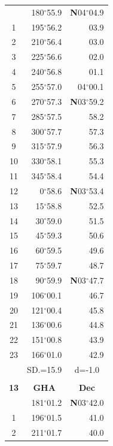\documentclass[10pt, a4paper]{report}
\begin{document}
\begin{scriptsize}
\begin{tabular*}{0.2\textwidth}[t]{@{\extracolsep{\fill}}|c|rr|}
\hline\rule{0pt}{2.6ex}\noindent
0 & 180$^\circ$55.9 & \textbf{N}04$^\circ$04.9\\
1 & 195$^\circ$56.2 & 03.9\\
2 & 210$^\circ$56.4 & 03.0\\
3 & 225$^\circ$56.6 & \raisebox{0.24ex}{\boldmath$\cdot$~\boldmath$\cdot$~~}02.0\\
4 & 240$^\circ$56.8 & 01.1\\
5 & 255$^\circ$57.0 & 04$^\circ$00.1\\[2Pt]
6 & 270$^\circ$57.3 & \textbf{N}03$^\circ$59.2\\
7 & 285$^\circ$57.5 & 58.2\\
8 & 300$^\circ$57.7 & 57.3\\
9 & 315$^\circ$57.9 & \raisebox{0.24ex}{\boldmath$\cdot$~\boldmath$\cdot$~~}56.3\\
10 & 330$^\circ$58.1 & 55.3\\
11 & 345$^\circ$58.4 & 54.4\\[2Pt]
12 & 0$^\circ$58.6 & \textbf{N}03$^\circ$53.4\\
13 & 15$^\circ$58.8 & 52.5\\
14 & 30$^\circ$59.0 & 51.5\\
15 & 45$^\circ$59.3 & \raisebox{0.24ex}{\boldmath$\cdot$~\boldmath$\cdot$~~}50.6\\
16 & 60$^\circ$59.5 & 49.6\\
17 & 75$^\circ$59.7 & 48.7\\[2Pt]
18 & 90$^\circ$59.9 & \textbf{N}03$^\circ$47.7\\
19 & 106$^\circ$00.1 & 46.7\\
20 & 121$^\circ$00.4 & 45.8\\
21 & 136$^\circ$00.6 & \raisebox{0.24ex}{\boldmath$\cdot$~\boldmath$\cdot$~~}44.8\\
22 & 151$^\circ$00.8 & 43.9\\
23 & 166$^\circ$01.0 & 42.9\\
\hline
\rule{0pt}{2.4ex} & \multicolumn{1}{c}{SD.=15.9} & \multicolumn{1}{c|}{d=-1.0}\\
\hline
\multicolumn{1}{c}{}\\[-0.5ex]\hline
\multicolumn{1}{|c|}{\rule{0pt}{2.6ex}\textbf{13}} & \multicolumn{1}{c}{\textbf{GHA}} & \multicolumn{1}{c|}{\textbf{Dec}}\\
\hline\rule{0pt}{2.6ex}\noindent
0 & 181$^\circ$01.2 & \textbf{N}03$^\circ$42.0\\
1 & 196$^\circ$01.5 & 41.0\\
2 & 211$^\circ$01.7 & 40.0\\

\end{tabular*}
\end{scriptsize}
\end{document}
